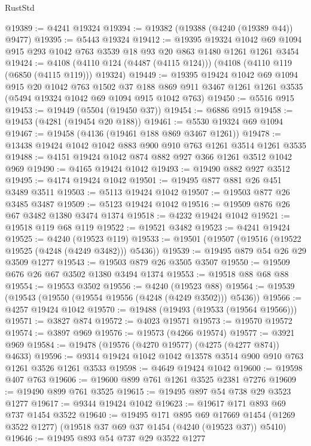 \begin{lexlean}{RustStd}
\begin{coremodule}
{\begin{coremodule}
{{{{{{{{{{{{{{{{{{{{{{{{{{{{{{{{{{{@19389 := @4241 @19324
@19394 := @19382 (@19388 (@4240 (@19389 @44)) @9477)
@19395 := @5443 @19324
@19412 := @19395
    @19324
    @1042
    @69
    @1094
    @915
    @293
    @1042
    @763
    @3539
    @18
    @93
    @20
    @863
    @1480
    @1261
    @1261
    @3454
@19424 := @4108 (@4110 @124 (@4487 (@4115 @124))) (@4108 (@4110 @119 (@6850 (@4115 @119))) @19324)
@19449 := @19395
    @19424
    @1042
    @69
    @1094
    @915
    @20
    @1042
    @763
    @1502
    @37
    @188
    @869
    @911
    @3467
    @1261
    @1261
    @3535
    (@5494 @19324 @1042 @69 @1094 @915 @1042 @763)
@19450 := @5516 @915
@19453 := @19449 (@5504 (@19450 @37))
@19454 := @6886 @915
@19458 := @19453 (@4281 (@19454 @20 @188))
@19461 := @5530 @19324 @69 @1094
@19467 := @19458 (@4136 (@19461 @188 @869 @3467 @1261))
@19478 := @13438 @19424 @1042 @1042 @883 @900 @910 @763 @1261 @3514 @1261 @3535
@19488 := @4151 @19424 @1042 @874 @882 @927 @366 @1261 @3512 @1042 @969
@19490 := @4165 @19424 @1042
@19493 := @19490 @882 @927 @3512
@19495 := @4174 @19424 @1042
@19501 := @19495 @877 @881 @26 @451 @3489 @3511
@19503 := @5113 @19424 @1042
@19507 := @19503 @877 @26 @3485 @3487
@19509 := @5123 @19424 @1042
@19516 := @19509 @876 @26 @67 @3482 @1380 @3474 @1374
@19518 := @4232 @19424 @1042
@19521 := @19518 @119 @68 @119
@19522 := @19521 @3482
@19523 := @4241 @19424
@19525 := @4240 (@19523 @119)
@19533 := @19501 (@19507 (@19516 (@19522 @19525 (@4248 (@4249 @3482))) @5436))
@19539 := @19495 @879 @54 @26 @29 @3509 @1277
@19543 := @19503 @879 @26 @3505 @3507
@19550 := @19509 @676 @26 @67 @3502 @1380 @3494 @1374
@19553 := @19518 @88 @68 @88
@19554 := @19553 @3502
@19556 := @4240 (@19523 @88)
@19564 := @19539 (@19543 (@19550 (@19554 @19556 (@4248 (@4249 @3502))) @5436))
@19566 := @4257 @19424 @1042
@19570 := @19488 (@19493 (@19533 (@19564 @19566)))
@19571 := @3827 @874
@19572 := @4023 @19571
@19573 := @19570 @19572
@19574 := @3897 @969
@19576 := @19573 (@4266 @19574)
@19577 := @3921 @969
@19584 := @19478 (@19576 (@4270 @19577) (@4275 (@4277 @874)) @4633)
@19596 := @9314 @19424 @1042 @1042 @13578 @3514 @900 @910 @763 @1261 @3526 @1261 @3533
@19598 := @4649 @19424 @1042
@19600 := @19598 @407 @763
@19606 := @19600 @899 @761 @1261 @3525 @2381 @7276
@19609 := @19490 @899 @761 @3525
@19615 := @19495 @897 @54 @738 @29 @3523 @1277
@19617 := @9344 @19424 @1042
@19623 := @19617 @171 @893 @69 @737 @1454 @3522
@19640 := @19495
    @171
    @895
    @69
    @17669
    @1454
    (@1269 @3522 @1277)
    (@19518 @37 @69 @37 @1454 (@4240 (@19523 @37)) @5410)
@19646 := @19495 @893 @54 @737 @29 @3522 @1277
}}}}}}}}}}}}}}}}}}}}}}}}}}}}}}}}}}}
\end{coremodule}}
\end{coremodule}
\end{lexlean}

